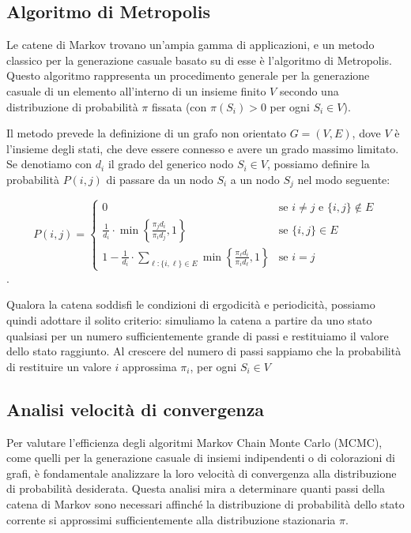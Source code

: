 \documentclass{article}
\begin{document}
\subsection{Algoritmo di Metropolis}

Le catene di Markov trovano un'ampia gamma di applicazioni, e un metodo classico per la generazione casuale basato su di esse \`e l'algoritmo di Metropolis. 
Questo algoritmo rappresenta un procedimento generale per la generazione casuale di un elemento all'interno di un 
insieme finito $V$ secondo una distribuzione di probabilit\`a $\pi$ fissata (con $\pi(S_i) > 0$ per ogni $S_i \in V$).

Il metodo prevede la definizione di un grafo non orientato $G = (V,E)$, dove $V$ è l'insieme degli stati, che deve essere connesso e avere un grado massimo limitato. 
Se denotiamo con \( d_i \) il grado del generico nodo \( S_i \in V \), possiamo definire la probabilità \( P(i,j) \) di passare da un nodo \( S_i \) a un nodo \( S_j \) nel modo seguente:

\[
P(i,j) =
\begin{cases}
0 & \text{se } i \neq j \text{ e } \{i,j\} \notin E \\
\frac{1}{d_i} \cdot \min\left\{ \frac{\pi_j d_i}{\pi_i d_j}, 1 \right\} & \text{se } \{i,j\} \in E \\
1 - \frac{1}{d_i} \cdot \sum_{\ell : \{i,\ell\} \in E} \min\left\{ \frac{\pi_\ell d_i}{\pi_i d_\ell}, 1 \right\} & \text{se } i = j
\end{cases}
\].

Qualora la catena soddisfi le condizioni di ergodicit\`a e periodicit\`a, possiamo quindi adottare il solito criterio: simuliamo la catena a partire da uno stato qualsiasi per un numero sufficientemente grande di passi e restituiamo il valore dello stato raggiunto. Al crescere del numero di passi sappiamo che la probabilit\`a di restituire un valore $i$ approssima $\pi_i$, per ogni $S_i \in V $

\subsection{Analisi velocità di convergenza}
Per valutare l'efficienza degli algoritmi Markov Chain Monte Carlo (MCMC), come quelli per la generazione casuale di insiemi indipendenti o di colorazioni di grafi, è fondamentale analizzare la loro velocità di convergenza alla distribuzione di probabilità desiderata. Questa analisi mira a determinare quanti passi della catena di Markov sono necessari affinché la distribuzione di probabilità dello stato corrente si approssimi sufficientemente alla distribuzione stazionaria $\pi$. 
\end{document}
